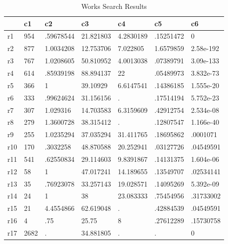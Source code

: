 \begin{table}[htbp]
\caption{\label{clabel} Works Search Results}\centering\medskip
\begin{tabular}{|l|l|l|l|l|l|l|}\hline  
 & c1  & c2  & c3  & c4  & c5  & c6  \\ \hline  
r1 & 954 & .59678544 & 21.821803 & 4.2830189 & .15251472 & 0 \\ \hline 
r2 & 877 & 1.0034208 & 12.753706 & 7.022805 & 1.6579859 & 2.58e-192 \\ \hline 
r3 & 767 & 1.0208605 & 50.810952 & 4.0013038 & .07389791 & 3.09e-133 \\ \hline 
r4 & 614 & .85939198 & 88.894137 & 22 & .05489973 & 3.832e-73 \\ \hline 
r5 & 366 & 1 & 39.10929 & 6.6147541 & .14386185 & 1.555e-20 \\ \hline 
r6 & 333 & .99624624 & 31.156156 & . & .17514194 & 5.752e-23 \\ \hline 
r7 & 307 & 1.029316 & 14.703583 & 6.3159609 & .42912754 & 2.534e-08 \\ \hline 
r8 & 279 & 1.3600728 & 38.315412 & . & .12807547 & 1.166e-40 \\ \hline 
r9 & 255 & 1.0235294 & 37.035294 & 31.411765 & .18695862 & .0001071 \\ \hline 
r10 & 170 & .3032258 & 48.870588 & 20.252941 & .03127726 & .04549591 \\ \hline 
r11 & 541 & .62550834 & 29.114603 & 9.8391867 & .14131375 & 1.604e-06 \\ \hline 
r12 & 58 & 1 & 47.017241 & 14.189655 & .13549707 & .02534141 \\ \hline 
r13 & 35 & .76923078 & 33.257143 & 19.028571 & .14095269 & 5.392e-09 \\ \hline 
r14 & 24 & 1 & 38 & 23.083333 & .75454956 & .31733002 \\ \hline 
r15 & 21 & 4.4554866 & 62.619048 & . & .42884539 & .04549591 \\ \hline 
r16 & 4 & .75 & 25.75 & 8 & .27612289 & .15730758 \\ \hline 
r17 & 2682 & . & 34.881805 & . & . & 0 \\ \hline 
  \end{tabular}
\end{table}

\endinput
